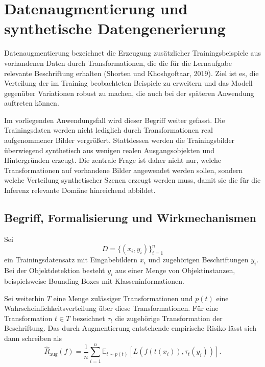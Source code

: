 
\chapter{Datenaugmentierung und synthetische Datengenerierung}

Datenaugmentierung bezeichnet die Erzeugung zusätzlicher Trainingsbeispiele aus vorhandenen Daten durch Transformationen, die die für die Lernaufgabe relevante Beschriftung erhalten (Shorten und Khoshgoftaar, 2019). Ziel ist es, die Verteilung der im Training beobachteten Beispiele zu erweitern und das Modell gegenüber Variationen robust zu machen, die auch bei der späteren Anwendung auftreten können.

Im vorliegenden Anwendungsfall wird dieser Begriff weiter gefasst. Die Trainingsdaten werden nicht lediglich durch Transformationen real aufgenommener Bilder vergrößert. Stattdessen werden die Trainingsbilder überwiegend synthetisch aus wenigen realen Ausgangsobjekten und Hintergründen erzeugt. Die zentrale Frage ist daher nicht nur, welche Transformationen auf vorhandene Bilder angewendet werden sollen, sondern welche Verteilung synthetischer Szenen erzeugt werden muss, damit sie die für die Inferenz relevante Domäne hinreichend abbildet.

\section{Begriff, Formalisierung und Wirkmechanismen}

Sei
\begin{equation}
D = \{(x_i,y_i)\}_{i=1}^{n}
\end{equation}
ein Trainingsdatensatz mit Eingabebildern $x_i$ und zugehörigen Beschriftungen $y_i$. Bei der Objektdetektion besteht $y_i$ aus einer Menge von Objektinstanzen, beispielsweise Bounding Boxes mit Klasseninformationen.

Sei weiterhin $T$ eine Menge zulässiger Transformationen und $p(t)$ eine Wahrscheinlichkeitsverteilung über diese Transformationen. Für eine Transformation $t \in T$ bezeichnet $\tau_t$ die zugehörige Transformation der Beschriftung. Das durch Augmentierung entstehende empirische Risiko lässt sich dann schreiben als
\begin{equation}
\hat R_{\mathrm{aug}}(f)
=
\frac{1}{n}
\sum_{i=1}^{n}
\mathbb{E}_{t\sim p(t)}
\left[
L\left(f(t(x_i)),\tau_t(y_i)\right)
\right].
\tag{3.1}
\end{equation}


